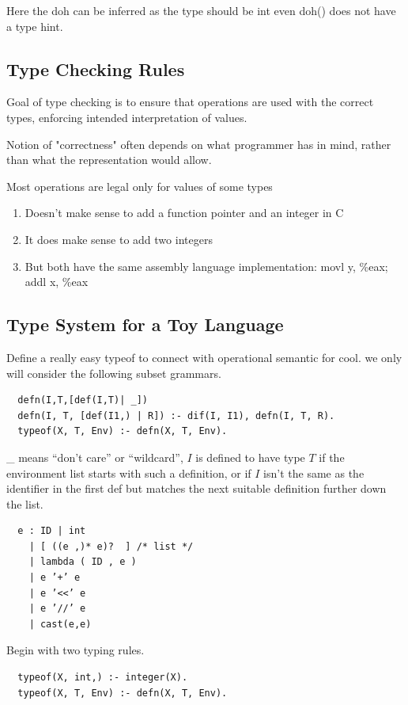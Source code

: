 \documentclass[a4paper]{exam}
\theoremstyle{definition}
\begin{document}
Here the doh can be inferred as the type should be int even doh() does not have a type hint.
\subsection{Type Checking Rules}
Goal of type checking is to ensure that operations are used with the correct types, enforcing intended interpretation of values.

Notion of "correctness" often depends on what programmer has in mind, rather than what the representation would allow.

Most operations are legal only for values of some types
\begin{enumerate}
  \item Doesn’t make sense to add a function pointer and an integer in C
  \item It does make sense to add two integers
  \item But both have the same assembly language implementation: movl y, \%eax;  addl x, \%eax
\end{enumerate}

\subsection{Type System for a Toy Language}
Define a really easy typeof to connect with operational semantic for cool. we only will consider the following subset grammars.
\begin{verbatim}
  defn(I,T,[def(I,T)| _])
  defn(I, T, [def(I1,) | R]) :- dif(I, I1), defn(I, T, R).
  typeof(X, T, Env) :- defn(X, T, Env).
  \end{verbatim}
\_ means “don’t care” or “wildcard”, $I$ is defined to have type $T$ if the environment list starts with such a definition, or if $I$ isn't the same as the identifier in the first def but matches the next suitable definition further down the list.
\begin{verbatim}
  e : ID | int
    | [ ((e ,)* e)?  ] /* list */
    | lambda ( ID , e )
    | e ’+’ e
    | e ’<<’ e
    | e ’//’ e
    | cast(e,e)
\end{verbatim}

Begin with two typing rules.
\begin{verbatim}
  typeof(X, int,) :- integer(X).
  typeof(X, T, Env) :- defn(X, T, Env).
\end{verbatim}
\end{document}
